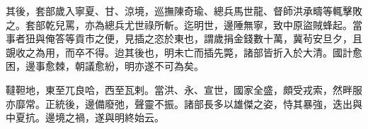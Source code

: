 \begin{pinyinscope}
其後，套部歲入寧夏、甘、涼境，巡撫陳奇瑜、總兵馬世龍、督師洪承疇等輒擊敗之。套部乾兒罵，亦為總兵尤世祿所斬。迄明世，邊陲無寧，致中原盜賊蜂起。當事者狃與俺答等貢市之便，見插之恣於東也，謂歲捐金錢數十萬，冀茍安旦夕，且覬收之為用，而卒不得。迨其後也，明未亡而插先斃，諸部皆折入於大清。國計愈困，邊事愈棘，朝議愈紛，明亦遂不可為矣。

韃靼地，東至兀良哈，西至瓦剌。當洪、永、宣世，國家全盛，頗受戎索，然畔服亦靡常。正統後，邊備廢弛，聲靈不振。諸部長多以雄傑之姿，恃其暴強，迭出與中夏抗。邊境之禍，遂與明終始云。


\end{pinyinscope}